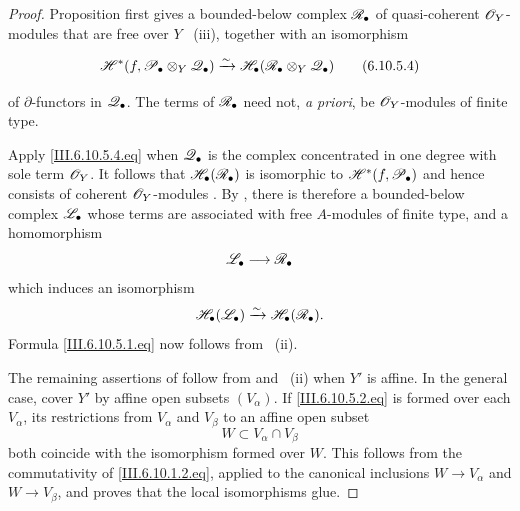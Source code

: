 \begin{proof}
Proposition  first gives a bounded-below
complex $\mathscr{R}_\bullet$  of quasi-coherent
$\mathscr{O}_Y$-modules that are free over $Y$
~(iii), together with an isomorphism
\begin{env}[6.10.5.4]
\label{III.6.10.5.4}
\[
  \sh H^*
  (f,\sh P_\bullet\otimes_Y\sh Q_\bullet)
  \xrightarrow{\sim}
  \sh H_\bullet
  (\sh R_\bullet\otimes_Y\sh Q_\bullet)
  \tag{6.10.5.4}\label{III.6.10.5.4.eq}
\]
\end{env}
of $\partial$-functors in $\mathscr{Q}_\bullet$.  The terms of
$\mathscr{R}_\bullet$ need not, \emph{a priori}, be
$\mathscr{O}_Y$-modules of finite type.

Apply \eqref{III.6.10.5.4.eq} when $\mathscr{Q}_\bullet$ is the
complex concentrated in one degree with sole term $\mathscr{O}_Y$.
It follows that $\mathscr{H}_\bullet(\mathscr{R}_\bullet)$ is isomorphic to
$\mathscr{H}^*(f,\mathscr{P}_\bullet)$ and hence consists of coherent
$\mathscr{O}_Y$-modules .  By
, there is therefore a bounded-below complex
$\mathscr{L}_\bullet$ whose terms are associated with free
$A$-modules of finite type, and a homomorphism
\[
  \mathscr{L}_\bullet\longrightarrow\mathscr{R}_\bullet
\]
which induces an isomorphism
\[
  \mathscr{H}_\bullet(\mathscr{L}_\bullet)
  \xrightarrow{\sim}
  \mathscr{H}_\bullet(\mathscr{R}_\bullet).
\]
Formula \eqref{III.6.10.5.1.eq} now follows from
~(ii).

The remaining assertions of  follow from
 and ~(ii) when $Y'$ is
affine.  In the general case, cover $Y'$ by affine open subsets
$(V_\alpha)$.  If
\eqref{III.6.10.5.2.eq} is formed over each $V_\alpha$, its
restrictions from $V_\alpha$ and $V_\beta$ to an affine open
subset
\[
  W\subset V_\alpha\cap V_\beta
\]
both coincide with the isomorphism formed over $W$.  This
follows from the commutativity of
\eqref{III.6.10.1.2.eq}, applied to the canonical inclusions
$W\to V_\alpha$ and $W\to V_\beta$, and proves that the local
isomorphisms glue.
\end{proof}

